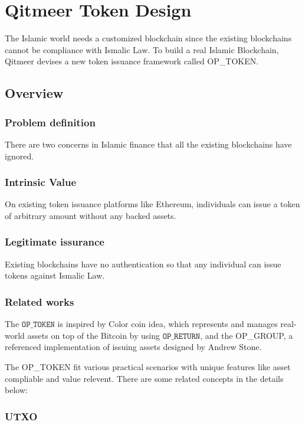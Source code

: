 \documentclass[a4paper,11pt]{article}
\begin{document}
\section{Qitmeer Token Design}
The Islamic world needs a customized blockchain since the existing blockchains cannot be compliance with Ismalic Law. To build a real Islamic Blockchain, Qitmeer devises a new token issuance framework called OP\_TOKEN.

\subsection{Overview}
\subsubsection{Problem definition}

There are two concerns in Islamic finance that all the existing blockchains have ignored.

\subsubsection*{Intrinsic Value}
On existing token issuance platforms like Ethereum, individuals can issue a token of arbitrary amount without any backed assets. 

\subsubsection*{Legitimate issurance}
Existing blockchains have no authentication so that any individual can issue tokens against Ismalic Law.

\subsubsection{Related works}

The $\texttt{OP\_TOKEN}$ is inspired by Color coin idea, which represents and manages real-world assets on top of the Bitcoin by using $\texttt{OP\_RETURN}$, and the OP\_GROUP, a referenced implementation of issuing assets designed by Andrew Stone.

The OP\_TOKEN fit various practical scenarios with unique features like asset compliable and value relevent. There are some related concepts in the details below:  

\subsubsection{UTXO}
\end{document}

